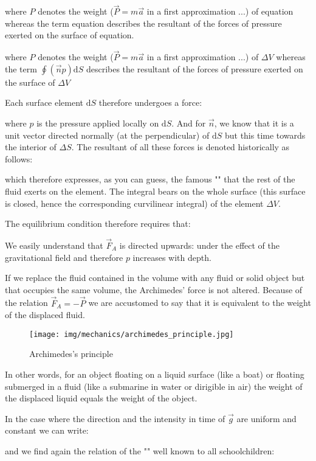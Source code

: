 	where $P$ denotes the weight ($\vec{P}=m\vec{a}$ in a first approximation ...) of equation whereas the term equation describes the resultant of the forces of pressure exerted on the surface of equation.
	
	where $P$ denotes the weight ($\vec{P}=m\vec{a}$ in a first approximation ...) of $\Delta V$ whereas the term $\oint (\vec{n}p)\mathrm{d}S$ describes the resultant of the forces of pressure exerted on the surface of $\Delta V$

	Each surface element $\mathrm{d}S$ therefore undergoes a force:
	
	where $p$ is the pressure applied locally on $\mathrm{d}S$. And for $\vec{n}$, we know that it is a unit vector directed normally (at the perpendicular) of $\mathrm{d}S$ but this time towards the interior of $\Delta S$. The resultant of all these forces is denoted historically as follows:
	
	which therefore expresses, as you can guess, the famous "" that the rest of the fluid exerts on the element. The integral bears on the whole surface (this surface is closed, hence the corresponding curvilinear integral) of the element $\Delta V$.
	
	The equilibrium condition therefore requires that:
	
	We easily understand that $\vec{F}_A$ is directed upwards: under the effect of the gravitational field and therefore $p$ increases with depth.

	If we replace the fluid contained in the volume with any fluid or solid object but that occupies the same volume, the Archimedes' force is not altered. Because of the relation $\vec{F}_A=-\vec{P}$ we are accustomed to say that it is equivalent to the weight of the displaced fluid.
	\begin{figure}[H]
		\centering
		\texttt{[image: img/mechanics/archimedes\_principle.jpg]}
		\caption{Archimedes's principle}
	\end{figure}
	In other words, for an object floating on a liquid surface (like a boat) or floating submerged in a fluid (like a submarine in water or dirigible in air) the weight of the displaced liquid equals the weight of the object. 
	
	In the case where the direction and the intensity in time of $\vec{g}$ are uniform and constant we can write:
	
	and we find again the relation of the "" well known to all schoolchildren:
	
